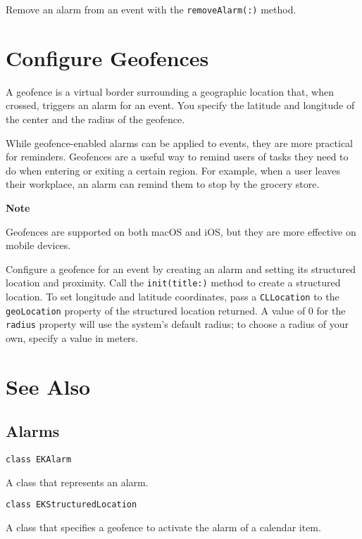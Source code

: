\documentclass{article}
\begin{document}
Remove an alarm from an event with the \texttt{removeAlarm(:)} method.

\section*{Configure Geofences}

A geofence is a virtual border surrounding a geographic location that, when crossed, triggers an alarm for an event. You specify the latitude and longitude of the center and the radius of the geofence.

While geofence-enabled alarms can be applied to events, they are more practical for reminders. Geofences are a useful way to remind users of tasks they need to do when entering or exiting a certain region. For example, when a user leaves their workplace, an alarm can remind them to stop by the grocery store.

\textbf{Note}

Geofences are supported on both macOS and iOS, but they are more effective on mobile devices.

Configure a geofence for an event by creating an alarm and setting its structured location and proximity. Call the \texttt{init(title:)} method to create a structured location. To set longitude and latitude coordinates, pass a \texttt{CLLocation} to the \texttt{geoLocation} property of the structured location returned. A value of 0 for the \texttt{radius} property will use the system's default radius; to choose a radius of your own, specify a value in meters.

\section*{See Also}

\subsection*{Alarms}

\texttt{class EKAlarm}

A class that represents an alarm.

\texttt{class EKStructuredLocation}

A class that specifies a geofence to activate the alarm of a calendar item.

\newpage
\end{document}
